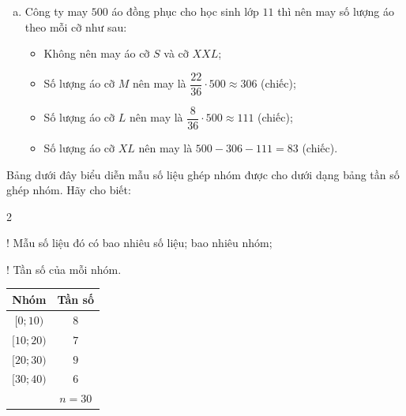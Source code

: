 \begin{ex}
{\begin{enumerate}[a)]
\begin{center}
			\end{center}
			\item Công ty may $500$ áo đồng phục cho học sinh lớp $11$ thì nên may số lượng  áo theo mỗi cỡ như sau:
			\begin{itemize}
				\item Không nên may áo  cỡ $S$ và cỡ $XXL$;
				\item Số lượng áo cỡ $M$ nên may là $\dfrac{22}{36}\cdot 500 \approx  306$ (chiếc);
				\item Số lượng áo cỡ $L$ nên may là $\dfrac{8}{36}\cdot 500 \approx 111$ (chiếc); 
				 \item Số lượng áo cỡ $XL$ nên may là $500-306-111=83$ (chiếc).
			\end{itemize}
		\end{enumerate}
	} 
\end{ex}

\begin{ex}%
	Bảng dưới đây biểu diễn mẫu số liệu ghép  nhóm được cho dưới dạng bảng tần số ghép nhóm. Hãy cho biết:
	\begin{enumEX}{2}
		\item! Mẫu số  liệu đó có bao nhiêu số liệu; bao nhiêu nhóm;
		\item! Tần  số của mỗi nhóm.
	\end{enumEX}
	\begin{center}
		\begin{tabular}{|c|c|}
			 \hline
			 Nhóm & Tần số \\
			 \hline
			$[0; 10)$  & $8$ \\
			 \hline
			 $[10; 20)$ & $7$ \\
			\hline 
			$[20; 30)$ &  $9$ \\
			 \hline
			$[30; 40)$  & $6$ \\
			\hline 
			& $n=30$  \\
			 \hline
		\end{tabular}
	\end{center}
\end{ex}

